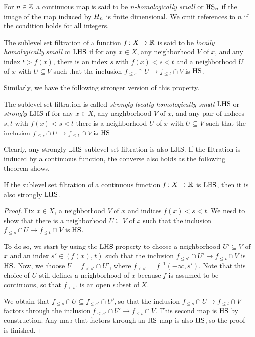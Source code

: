 \begin{defi} \label{defi:local_connectedness}
	For $n \in \mathbb{Z}$ a continuous map is said to be \textit{$n$-homologically small} or $\mathrm{HS}_n$ if the image of the map induced by $H_{n}$ is finite dimensional.
	We omit references to $n$ if the condition holds for all integers.
\end{defi}

\begin{defi} \label{defi:local_connectedness_filtrations}
	The sublevel set filtration of a function $f \colon X \to \mathbb{R}$ is said to be \emph{locally homologically small} or $\mathrm{LHS}$ if for any $x \in X$, any neighborhood $V$ of $x$, and any index $t > f(x)$, there is an index $s$ with  $f(x) < s < t$ and a neighborhood $U$ of $x$ with $U \subseteq V$ such that the inclusion $f_{\leq s} \cap U \to f_{\leq t} \cap V$ is $\mathrm{HS}$.
\end{defi}
Similarly, we have the following stronger version of this property.
\begin{defi}
	The sublevel set filtration is called \emph{strongly locally homologically small $\mathrm{LHS}$} or \emph{strongly $\mathrm{LHS}$} if for any $x \in X$, any neighborhood $V$ of $x$, and any pair of indices $s,t$ with $f(x) < s < t$ there is a neighborhood $U$ of $x$ with $U \subseteq V$ such that the inclusion $f_{\leq s} \cap U \to f_{\leq t} \cap V$ is $\mathrm{HS}$.
\end{defi}

Clearly, any strongly $\mathrm{LHS}$ sublevel set filtration is also $\mathrm{LHS}$.
If the filtration is induced by a continuous function, the converse also holds as the following theorem shows.

\begin{thm}\label{thm:hlc_to_strong_hlc}
    If the sublevel set filtration of a continuous function $f \colon X \to \mathbb{R}$ is $\mathrm{LHS}$, then it is also strongly $\mathrm{LHS}$.
\end{thm}
\begin{proof}
    Fix $x \in X$, a neighborhood $V$ of $x$ and indices $f(x) < s < t$.
	We need to show that there is a neighborhood $U \subseteq V$ of $x$ such that the inclusion $f_{\leq s} \cap U \to f_{\leq t} \cap V$ is $\mathrm{HS}$.
    
    To do so, we start by using the $\mathrm{LHS}$ property to choose a neighborhood $U' \subseteq V$ of $x$ and an index $s' \in (f(x),\, t)$ such that the inclusion $f_{\leq s'} \cap U' \to f_{\leq t} \cap V$ is $\mathrm{HS}$.
    Now, we choose $U = f_{< s'} \cap U'$, where $f_{< s'} = f^{-1} (-\infty, s')$.
    Note that this choice of $U$ still defines a neighborhood of $x$ because $f$ is assumed to be continuous, so that $f_{< s'}$ is an open subset of $X$.
    
    We obtain that $f_{\leq s} \cap U \subseteq f_{\leq s'} \cap U'$, so that the inclusion $f_{\leq s} \cap U \to f_{\leq t} \cap V$ factors through the inclusion $f_{\leq s'} \cap U' \to f_{\leq t} \cap V$.
	This second map is $\mathrm{HS}$ by construction.
	Any map that factors through an $\mathrm{HS}$ map is also $\mathrm{HS}$, so the proof is finished.
\end{proof}

